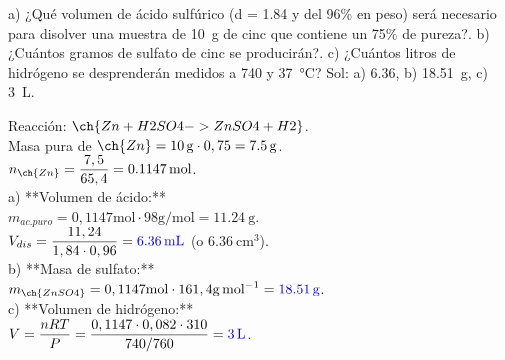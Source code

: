 \begin{exercise}
    a) ¿Qué volumen de ácido sulfúrico (d = \qty{1.84}{\gpml} y del 96\% en peso) será necesario para disolver una muestra de  \qty{10}{\g} de cinc que contiene un 75\% de pureza?. b) ¿Cuántos gramos de sulfato de cinc se producirán?. c) ¿Cuántos litros de hidrógeno se desprenderán medidos a  \qty{740}{\mmhg} y \qty{37}{\celsius}?
    Sol: a) \qty{6.36}{\cc}, b) \qty{18.51}{\g}, c) \qty{3}{\L}.

    \begin{solu}
        Reacción: \( \ch{Zn + H2SO4 -> ZnSO4 + H2} \). \\
        Masa pura de \( \ch{Zn} = \qty{10}{\g} \cdot 0,75 = \qty{7,5}{\g} \). \\
        \( n_{\ch{Zn}} = \dfrac{7,5}{65,4} = \qty{0,1147}{\mol} \). \\
        a) **Volumen de ácido:** \\
        \( m_{ac. puro} = 0,1147 \si{\mol} \cdot 98 \si{\g\per\mol} = \qty{11,24}{\g} \). \\
        \( V_{dis} = \dfrac{11,24}{1,84 \cdot 0,96} = \mathbf{\textcolor{blue}{\qty{6,36}{\mL}}} \) (o \( \qty{6,36}{\cm^3} \)). \\
        b) **Masa de sulfato:** \\
        \( m_{\ch{ZnSO4}} = 0,1147 \si{\mol} \cdot 161,4 \si{\g\per\mol} = \mathbf{\textcolor{blue}{\qty{18,51}{\g}}} \). \\
        c) **Volumen de hidrógeno:** \\
        \( V = \dfrac{nRT}{P} = \dfrac{0,1147 \cdot 0,082 \cdot 310}{740/760} = \mathbf{\textcolor{blue}{\qty{3}{\L}}} \).
    \end{solu}

\end{exercise}

